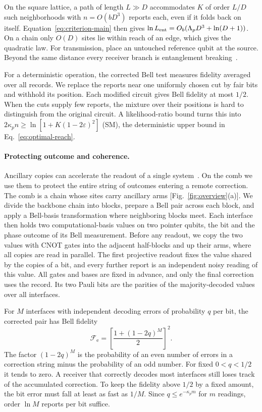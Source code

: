 \documentclass[aps,prl,twocolumn,superscriptaddress,longbibliography,reprint,floatfix]{revtex4-2}
\newcommand{\eps}{\varepsilon}
\newcommand{\Fe}{\mathcal F_{\mathrm e}}
\begin{document}
On the square lattice, a path of length $L\gg D$ accommodates $K$ of order $L/D$ such neighborhoods with $n=O(bD^3)$ reports each, even if it folds back on itself. Equation~\eqref{eq:criterion-main} then gives $\ln L_{\rm ent}=O_b(\Lambda_pD^3+\ln(D+1))$. On a chain only $O(D)$ sites lie within reach of an edge, which gives the quadratic law. For transmission, place an untouched reference qubit at the source. Beyond the same distance every receiver branch is entanglement breaking~\cite{HSR2003}.

For a deterministic operation, the corrected Bell test measures fidelity averaged over all records. We replace the reports near one uniformly chosen cut by fair bits and withhold its position. Each modified circuit gives Bell fidelity at most $1/2$. When the cuts supply few reports, the mixture over their positions is hard to distinguish from the original circuit. A likelihood-ratio bound turns this into $2\kappa_pn\ge\ln[1+K(1-2\eps)^2]$ (SM), the deterministic upper bound in Eq.~\eqref{eq:optimal-reach}.

\smallskip
\paragraph*{Protecting outcome and coherence.}
Ancillary copies can accelerate the readout of a single system~\cite{Corlett2025}. On the comb we use them to protect the entire string of outcomes entering a remote correction. The comb is a chain whose sites carry ancillary arms [Fig.~\ref{fig:overview}(a)]. We divide the backbone chain into blocks, prepare a Bell pair across each block, and apply a Bell-basis transformation where neighboring blocks meet. Each interface then holds two computational-basis values on two pointer qubits, the bit and the phase outcome of its Bell measurement. Before any readout, we copy the two values with CNOT gates into the adjacent half-blocks and up their arms, where all copies are read in parallel. The first projective readout fixes the value shared by the copies of a bit, and every further report is an independent noisy reading of this value. All gates and bases are fixed in advance, and only the final correction uses the record. Its two Pauli bits are the parities of the majority-decoded values over all interfaces.

For $M$ interfaces with independent decoding errors of probability $q$ per bit, the corrected pair has Bell fidelity
\begin{equation}
 \Fe=\left[\frac{1+(1-2q)^M}{2}\right]^2 .
 \label{eq:resource-fidelity-main}
\end{equation}
The factor $(1-2q)^M$ is the probability of an even number of errors in a correction string minus the probability of an odd number. For fixed $0<q<1/2$ it tends to zero. A receiver that correctly decodes most interfaces still loses track of the accumulated correction. To keep the fidelity above $1/2$ by a fixed amount, the bit error must fall at least as fast as $1/M$. Since $q\le e^{-\kappa_pm}$ for $m$ readings, order $\ln M$ reports per bit suffice.
\end{document}
